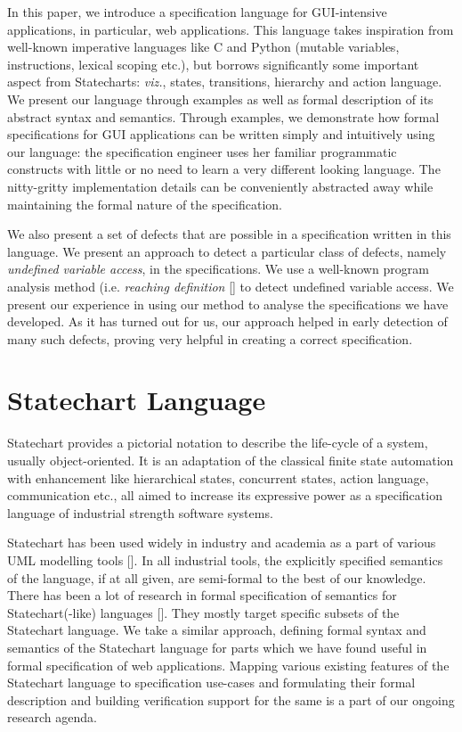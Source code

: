 \documentclass[12pt,a4paper]{report}
\begin{document}
In this paper, we introduce a specification language for GUI-intensive applications, in particular, web applications. This language takes inspiration from well-known imperative languages like C and Python (mutable variables, instructions, lexical scoping etc.), but borrows significantly some important aspect from Statecharts: \emph{viz.}, states, transitions, hierarchy and action language. We present our language through examples as well as  formal description of its abstract syntax and semantics. Through examples, we demonstrate how formal specifications for GUI applications can be written simply and intuitively using our language: the specification engineer uses her familiar programmatic constructs with little or no need to learn a very different looking language. The nitty-gritty implementation details can be conveniently abstracted away while maintaining the formal nature of the specification.

We also present a set of defects that are possible in a specification written in this language. We present an approach to detect a particular class of defects, namely \emph{undefined variable access}, in the specifications. We use a well-known program analysis method (i.e. \emph{reaching definition} [] to detect undefined variable access. We present our experience in using our method to analyse the specifications we have developed. As it has turned out for us, our approach helped in early detection of many such defects, proving very helpful in creating a correct specification.


\section{Statechart Language}
Statechart provides a pictorial notation to describe the life-cycle of a system, usually object-oriented. It is an adaptation of the classical finite state automation with enhancement like hierarchical states, concurrent states, action language, communication etc., all aimed to increase its expressive power as a specification language of industrial strength software systems. 

Statechart has been used widely in industry and academia as a part of various UML modelling tools []. In all industrial tools, the explicitly specified semantics of the language, if at all given, are semi-formal to the best of our knowledge. There has been a lot of research in formal specification of semantics for Statechart(-like) languages []. They mostly target specific subsets of the Statechart language. We take a similar approach, defining formal syntax and semantics of the Statechart language for parts which we have found useful in formal specification of web applications. Mapping various existing features of the Statechart language to specification use-cases and formulating their formal description and building verification support for the same is a part of our ongoing research agenda.
\end{document}
